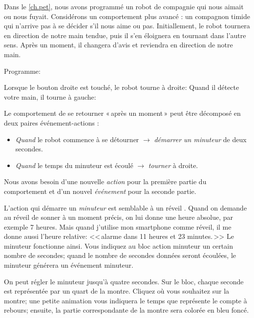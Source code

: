 \label{ch.time}

Dans le \cref{ch.pet}, nous avons programmé un robot de compagnie qui nous aimait ou nous fuyait.
Considérons un comportement plus avancé : un compagnon timide qui n'arrive pas à se décider s'il nous aime ou pas.
Initiallement, le robot tournera en direction de notre main tendue, puis il s'en éloignera en tournant dans l'autre sens.
Après un moment, il changera d'avis et reviendra en direction de notre main.

{\raggedleft \hfill Programme: }

Lorsque le bouton droite est touché, le robot tourne à droite:
Quand il détecte votre main, il tourne à gauche:  

Le comportement de se retourner «\,après un moment\,» peut être décomposé en deux paires événement-actions :
\begin{itemize}

\item \emph{Quand} le robot commence à se détourner $\rightarrow$ \emph{démarrer un minuteur} de deux secondes.

\item \emph{Quand} le temps du minuteur est écoulé $\rightarrow$ \emph{tourner} à droite.

\end{itemize}

Nous avons besoin d'une nouvelle \emph{action} pour la première partie du comportement et d'un nouvel \emph{événement} pour la seconde partie.

L'action qui démarre un \emph{minuteur}
est semblable à un réveil .
Quand on demande au réveil de sonner à un moment précis,
on lui donne une heure absolue, par exemple 7 heures.
Mais quand j'utilise mon smartphone comme réveil,
il me donne aussi l'heure relative: <<\,alarme dans 11 heures et 23 minutes.\,>>
Le minuteur fonctionne ainsi.
Vous indiquez au bloc action minuteur un certain nombre de secondes; quand le nombre de secondes données seront écoulées,
le minuteur générera un événement minuteur.

On peut régler le minuteur jusqu'à quatre secondes.
Sur le bloc, chaque seconde est représentée par un quart de la montre.
Cliquez où vous souhaitez sur la montre;
une petite animation vous indiquera le temps que représente le compte à rebours;
ensuite, la partie correspondante de la montre sera colorée en bleu foncé.

